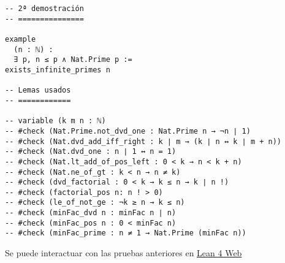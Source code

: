 \begin{verbatim}
-- 2ª demostración
-- ===============

example
  (n : ℕ) :
  ∃ p, n ≤ p ∧ Nat.Prime p :=
exists_infinite_primes n

-- Lemas usados
-- ============

-- variable (k m n : ℕ)
-- #check (Nat.Prime.not_dvd_one : Nat.Prime n → ¬n ∣ 1)
-- #check (Nat.dvd_add_iff_right : k ∣ m → (k ∣ n ↔ k ∣ m + n))
-- #check (Nat.dvd_one : n ∣ 1 ↔ n = 1)
-- #check (Nat.lt_add_of_pos_left : 0 < k → n < k + n)
-- #check (Nat.ne_of_gt : k < n → n ≠ k)
-- #check (dvd_factorial : 0 < k → k ≤ n → k ∣ n !)
-- #check (factorial_pos n: n ! > 0)
-- #check (le_of_not_ge : ¬k ≥ n → k ≤ n)
-- #check (minFac_dvd n : minFac n ∣ n)
-- #check (minFac_pos n : 0 < minFac n)
-- #check (minFac_prime : n ≠ 1 → Nat.Prime (minFac n))
\end{verbatim}
Se puede interactuar con las pruebas anteriores en \href{https://lean.math.hhu.de/\#url=https://raw.githubusercontent.com/jaalonso/Calculemus2/main/src/Infinitud\_de\_primos.lean}{Lean 4 Web}

